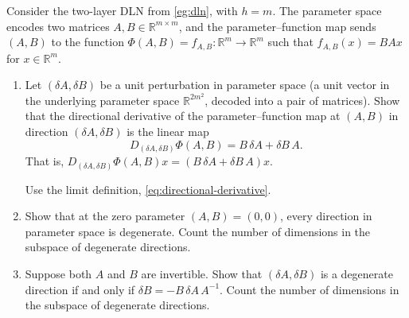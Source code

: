 \documentclass[11pt]{article}
\newcommand{\R}{\mathbb{R}}
\begin{document}
\begin{exercise}
\label{ex:dln-degeneracy}
    Consider the two-layer DLN from \cref{eg:dln}, with $h=m$. The parameter
    space encodes two matrices $A, B \in \R^{m \times m}$, and the
    parameter--function map sends $(A, B)$ to the function
        $\Phi(A,B) = f_{A,B} : \R^m \to \R^m$ such that $f_{A,B}(x) = BAx$
    for $x \in \R^m$.
\begin{enumerate}
    \item
        Let $(\delta\!A, \delta\!B)$ be a unit perturbation in parameter space
        (a unit vector in the underlying parameter space $\R^{2m^2}$, decoded
        into a pair of matrices).
        Show that the directional derivative of the parameter--function map
        at $(A, B)$ in direction $(\delta\!A, \delta\!B)$ is the linear map
        \begin{equation*}
            D_{(\delta\!A, \delta\!B)} \Phi(A, B)
            = B\,\delta\!A + \delta\!B\, A.
        \end{equation*}
        That is,
            $D_{(\delta\!A, \delta\!B)} \Phi(A, B) x
            = (B\,\delta\!A + \delta\!B\, A) x$.
        \begin{hint}
Use the limit definition, \eqref{eq:directional-derivative}.
        \end{hint}
    \item
        \label{ex:dln-degeneracy:null-rank}
        Show that at the zero parameter $(A, B) = (0, 0)$, every direction
        in parameter space is degenerate.
        Count the number of dimensions in the subspace of degenerate directions.
        
    \item
        \label{ex:dln-degeneracy:full-rank}
        Suppose both $A$ and $B$ are invertible. Show that
        $(\delta\!A, \delta\!B)$ is a degenerate direction if and only if
        $\delta\!B = -B\,\delta\!A\, A^{-1}$.
        Count the number of dimensions in the subspace of degenerate directions.
        

\end{enumerate}
\end{exercise}
\end{document}
